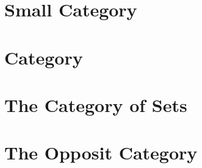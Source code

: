 \section{Small Category}
    
\section{Category}
    
\section{The Category of Sets}
    
\section{The Opposit Category}
    
